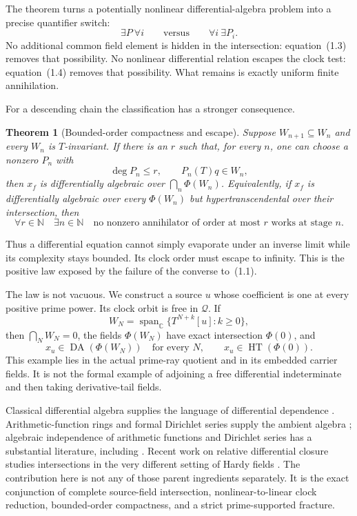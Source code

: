 \documentclass[11pt]{article}
\newtheorem{theorem}{Theorem}[section]
\theoremstyle{definition}
\theoremstyle{remark}
\newcommand{\C}{\mathbb C}
\newcommand{\N}{\mathbb N}
\newcommand{\Q}{\mathcal Q}
\newcommand{\Span}{\operatorname{span}}
\newcommand{\DA}{\operatorname{DA}}
\newcommand{\HT}{\operatorname{HT}}
\begin{document}
The theorem turns a potentially nonlinear differential-algebra problem into a precise quantifier
switch:
\[
  \exists P\ \forall i
  \qquad\text{versus}\qquad
  \forall i\ \exists P_i.                                      \tag{1.6}
\]
No additional common field element is hidden in the intersection: equation~(1.3) removes that
possibility.  No nonlinear differential relation escapes the clock test: equation~(1.4) removes
that possibility.  What remains is exactly uniform finite annihilation.

For a descending chain the classification has a stronger consequence.

\begin{theorem}[Bounded-order compactness and escape]\label{thm:escape-intro}
Suppose $W_{n+1}\subseteq W_n$ and every $W_n$ is $T$-invariant.  If there is an $r$ such that,
for every $n$, one can choose a nonzero $P_n$ with
\[
  \deg P_n\leq r,
  \qquad P_n(T)q\in W_n,                                      \tag{1.7}
\]
then $x_f$ is differentially algebraic over $\bigcap_n\Phi(W_n)$.  Equivalently, if $x_f$ is
differentially algebraic over every $\Phi(W_n)$ but hypertranscendental over their intersection,
then
\[
  \forall r\in\N\quad\exists n\in\N\quad
  \text{no nonzero annihilator of order at most $r$ works at stage $n$}. \tag{1.8}
\]
\end{theorem}

Thus a differential equation cannot simply evaporate under an inverse limit while its complexity
stays bounded.  Its clock order must escape to infinity.  This is the positive law exposed by the
failure of the converse to~(1.1).

The law is not vacuous.  We construct a source $u$ whose coefficient is one at every positive
prime power.  Its clock orbit is free in $\Q$.  If
\[
  W_N=\Span_{\C}\{T^{N+k}[u]:k\geq0\},                         \tag{1.9}
\]
then $\bigcap_NW_N=0$, the fields $\Phi(W_N)$ have exact intersection $\Phi(0)$, and
\[
  x_u\in\DA(\Phi(W_N))\quad\text{for every $N$},
  \qquad x_u\in\HT(\Phi(0)).                                  \tag{1.10}
\]
This example lies in the actual prime-ray quotient and in its embedded carrier fields.  It is not
the formal example of adjoining a free differential indeterminate and then taking derivative-tail
fields.

Classical differential algebra supplies the language of differential dependence
\cite{Kolchin1973}.  Arithmetic-function rings and formal Dirichlet series supply the ambient
algebra \cite{CashwellEverett1959}; algebraic independence of arithmetic functions and Dirichlet
series has a substantial literature, including \cite{ShapiroSparer1986,Pong2016}.  Recent work on
relative differential closure studies intersections in the very different setting of Hardy fields
\cite{AschenbrennerVanDenDriesVanDerHoeven2025}.  The contribution here is not any of those parent
ingredients separately.  It is the exact conjunction of complete source-field intersection,
nonlinear-to-linear clock reduction, bounded-order compactness, and a strict prime-supported
fracture.
\end{document}

